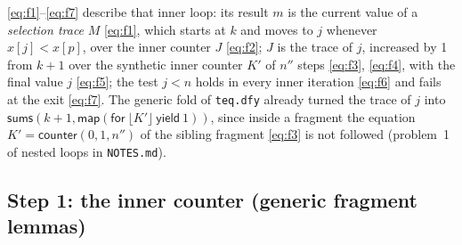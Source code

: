 \documentclass[11pt,a4paper]{article}
\newcommand{\bl}[1]{\lfloor #1\rfloor}                       %
\newcommand{\mapc}[2]{\mathsf{map}(\mathsf{for}\ #1\ \mathsf{yield}\ #2)}
\newcommand{\cnt}{\mathsf{counter}}
\newcommand{\sums}{\mathsf{sums}}
\begin{document}
\eqref{eq:f1}--\eqref{eq:f7} describe that inner loop: its result $m$ is the current value of a
\emph{selection trace} $M$ \eqref{eq:f1}, which starts at $k$ and moves to $j$ whenever $x[j] < x[p]$,
over the inner counter $J$ \eqref{eq:f2}; $J$ is the trace of $j$, increased by 1 from $k + 1$ over the
synthetic inner counter $K'$ of $n''$ steps \eqref{eq:f3}, \eqref{eq:f4}, with the final value $j$
\eqref{eq:f5}; the test $j < n$ holds in every inner iteration \eqref{eq:f6} and fails at the exit
\eqref{eq:f7}. The generic fold of \texttt{teq.dfy} already turned the trace of $j$ into
$\sums(k + 1, \mapc{\bl{K'}}{1})$, since inside a fragment the equation $K' = \cnt(0, 1, n'')$ of the
sibling fragment \eqref{eq:f3} is not followed (problem~1 of nested loops in \texttt{NOTES.md}).

\subsection{Step 1: the inner counter (generic fragment lemmas)}\label{sec:sel:frag}
\end{document}
